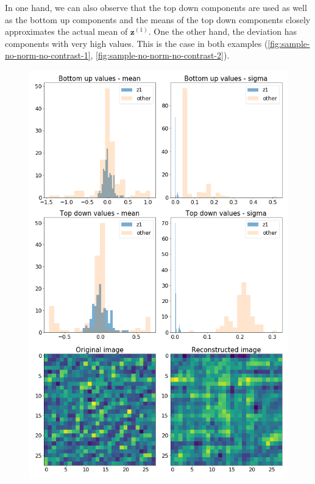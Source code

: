 \documentclass[12pt, english]{article}
\begin{document}
\par In one hand, we can also observe that the top down components are used as well as the bottom up components and the means of the top down components closely approximates the actual mean of $\bm{z}^{(1)}$. One the other hand, the deviation has components with very high values. This is the case in both examples (\ref{fig:sample-no-norm-no-contrast-1}, \ref{fig:sample-no-norm-no-contrast-2}).

\vspace{4mm}

\begin{figure}[H]
  \begin{minipage}{0.5\linewidth}
    \centering
    \includegraphics[width=.6\linewidth]{z1_vis/z1_vis_no_contrast_norm/17_DenseLinLinLadderVAE_contrastNorm-stats-1_TD_BU_COMPS_1.png}
  \end{minipage}
  \begin{minipage}{0.5\linewidth}
    \centering

\end{minipage}
\end{figure}
\end{document}
